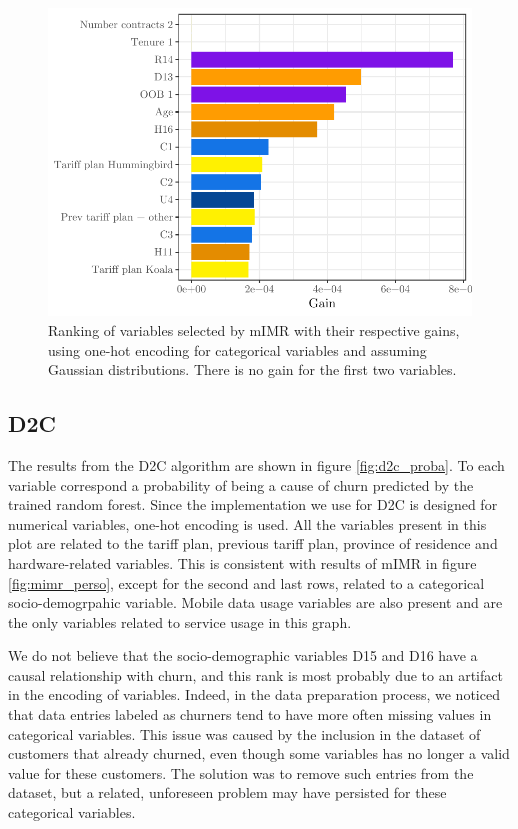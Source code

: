 \begin{figure}
    \centering
    \includegraphics[width=0.9\linewidth]{figures/mimr_original.pdf}
    \caption{Ranking of variables selected by mIMR with their respective gains,
    using one-hot encoding for categorical variables and assuming Gaussian
    distributions. There is no gain for the first two variables.}
    \label{fig:mimr_original}
\end{figure}

\subsection{D2C}

The results from the D2C algorithm are shown in figure \ref{fig:d2c_proba}. To
each variable correspond a probability of being a cause of churn predicted by
the trained random forest. Since the implementation we use for D2C is designed
for numerical variables, one-hot encoding is used. All the variables present in
this plot are related to the tariff plan, previous tariff plan, province of
residence and hardware-related variables. This is consistent with results of
mIMR in figure \ref{fig:mimr_perso}, except for the second and last rows,
related to a categorical socio-demogrpahic variable. Mobile data usage variables
are also present and are the only variables related to service usage in this
graph.

We do not believe that the socio-demographic variables D15 and D16 have a causal
relationship with churn, and this rank is most probably due to an artifact in
the encoding of variables. Indeed, in the data preparation process, we noticed
that data entries labeled as churners tend to have more often missing values in
categorical variables. This issue was caused by the inclusion in the dataset of
customers that already churned, even though some variables has no longer a valid
value for these customers. The solution was to remove such entries from the
dataset, but a related, unforeseen problem may have persisted for these
categorical variables.

